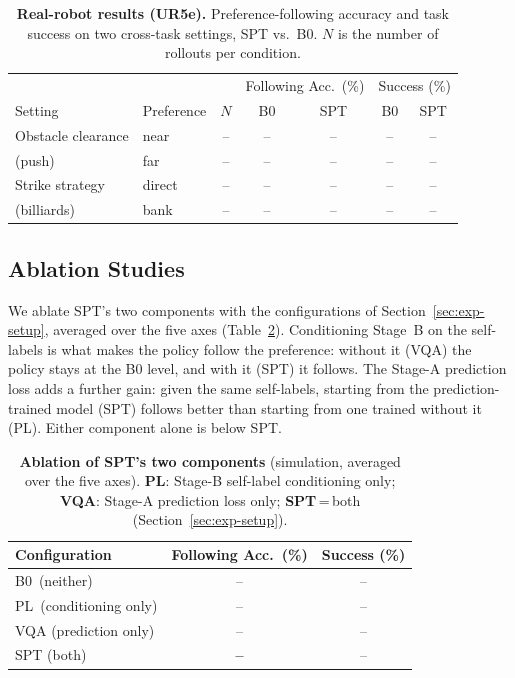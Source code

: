 \begin{table}[t]
  \centering
  \small
  \caption{\textbf{Real-robot results (UR5e).} Preference-following accuracy and
  task success on two cross-task settings, SPT vs.\ B0. $N$ is the number of
  rollouts per condition.}
  \label{tab:real_main}
  \begin{tabular}{llccccc}
    \hline
    & & & \multicolumn{2}{c}{Following Acc.\ (\%)} & \multicolumn{2}{c}{Success (\%)} \\
    Setting & Preference & $N$ & B0 & SPT & B0 & SPT \\
    \hline
    Obstacle clearance & near   & -- & -- & -- & -- & -- \\
    (push)             & far    & -- & -- & -- & -- & -- \\
    Strike strategy    & direct & -- & -- & -- & -- & -- \\
    (billiards)        & bank   & -- & -- & -- & -- & -- \\
    \hline
  \end{tabular}
\end{table}

\subsection{Ablation Studies}
\label{sec:exp-ablation}

We ablate SPT's two components with the configurations of
Section~\ref{sec:exp-setup}, averaged over the five axes
(Table~\ref{tab:ablation}). Conditioning Stage~B on the self-labels is what makes
the policy follow the preference: without it (VQA) the policy stays at the B0
level, and with it (SPT) it follows. The Stage-A prediction loss adds a further
gain: given the same self-labels, starting from the prediction-trained model
(SPT) follows better than starting from one trained without it (PL). Either
component alone is below SPT.

\begin{table}[t]
  \centering
  \small
  \caption{\textbf{Ablation of SPT's two components} (simulation, averaged over
  the five axes). \textbf{PL}: Stage-B self-label conditioning only;
  \textbf{VQA}: Stage-A prediction loss only; \textbf{SPT}\,=\,both
  (Section~\ref{sec:exp-setup}).}
  \label{tab:ablation}
  \begin{tabular}{lcc}
    \hline
    Configuration & Following Acc.\ (\%) & Success (\%) \\
    \hline
    B0 \,(neither)              & -- & -- \\
    PL \,(conditioning only)    & -- & -- \\
    VQA (prediction only)       & -- & -- \\
    SPT (both)                  & \textbf{--} & -- \\
    \hline
  \end{tabular}
\end{table}

